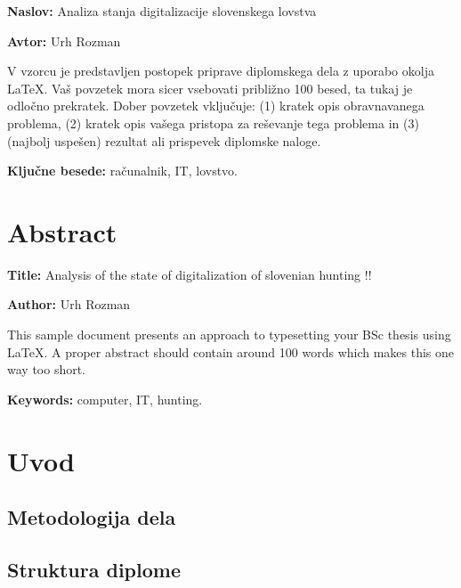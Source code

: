 \documentclass[a4paper,12pt,openright]{book}
\newcommand{\ttitle}{Analiza stanja digitalizacije slovenskega lovstva}
\newcommand{\ttitleEn}{Analysis of the state of digitalization of slovenian hunting !!}
\newcommand{\tauthor}{Urh Rozman}
\newcommand{\tkeywords}{računalnik, IT, lovstvo}
\newcommand{\tkeywordsEn}{computer, IT, hunting}
\newcommand{\clearemptydoublepage}{\newpage{\pagestyle{empty}\cleardoublepage}}
\begin{document}
\noindent\textbf{Naslov:} \ttitle
\bigskip

\noindent\textbf{Avtor:} \tauthor
\bigskip

\noindent V vzorcu je predstavljen postopek priprave diplomskega dela z uporabo okolja \LaTeX. Vaš povzetek mora sicer vsebovati približno 100 besed, ta tukaj je odločno prekratek.
Dober povzetek vključuje: (1) kratek opis obravnavanega problema, (2) kratek opis vašega pristopa za reševanje tega problema in (3) (najbolj uspešen) rezultat ali prispevek diplomske naloge.

\bigskip

\noindent\textbf{Ključne besede:} \tkeywords.
\clearemptydoublepage

\chapter*{Abstract}

\noindent\textbf{Title:} \ttitleEn
\bigskip

\noindent\textbf{Author:} \tauthor
\bigskip

\noindent This sample document presents an approach to typesetting your BSc thesis using \LaTeX. 
A proper abstract should contain around 100 words which makes this one way too short.
\bigskip

\noindent\textbf{Keywords:} \tkeywordsEn.
\clearemptydoublepage

\mainmatter
\setcounter{page}{1}
\pagestyle{fancy}



\chapter{Uvod}
\label{start}

\section{Metodologija dela}

\section{Struktura diplome}
\end{document}
